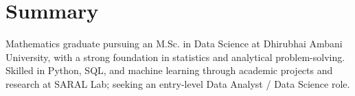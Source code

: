 \section{Summary}
Mathematics graduate pursuing an M.Sc. in Data Science at Dhirubhai Ambani University, with a strong foundation in statistics and analytical problem-solving. Skilled in Python, SQL, and machine learning through academic projects and research at SARAL Lab; seeking an entry-level Data Analyst / Data Science role.
